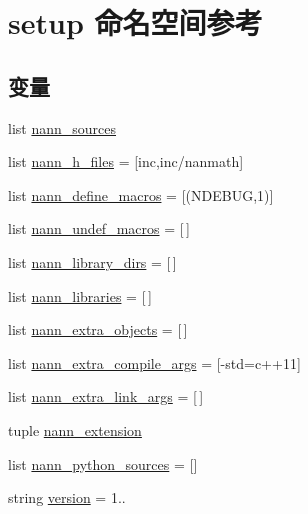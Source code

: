 \hypertarget{namespacesetup}{}\section{setup 命名空间参考}
\label{namespacesetup}
\subsection*{变量}
\begin{DoxyCompactItemize}
\item 
list \hyperlink{namespacesetup_a4b5f9185c7fc55c9c97ee2ff3565c4ae}{nann\+\_\+sources}
\item 
list \hyperlink{namespacesetup_a25d264f9c4a7736a9768459d01558f6e}{nann\+\_\+h\+\_\+files} = \mbox{[}\textquotesingle{}inc\textquotesingle{},\textquotesingle{}inc/nanmath\textquotesingle{}\mbox{]}
\item 
list \hyperlink{namespacesetup_a707ac5d361a916ed078172866c82b945}{nann\+\_\+define\+\_\+macros} = \mbox{[}(\textquotesingle{}N\+D\+E\+B\+U\+G\textquotesingle{},\textquotesingle{}1\textquotesingle{})\mbox{]}
\item 
list \hyperlink{namespacesetup_af38ce6c9c3a49620b55d56731ddc9e25}{nann\+\_\+undef\+\_\+macros} = \mbox{[}$\,$\mbox{]}
\item 
list \hyperlink{namespacesetup_aa5c01e7a20f0777834d3baeb4a26d4ab}{nann\+\_\+library\+\_\+dirs} = \mbox{[}$\,$\mbox{]}
\item 
list \hyperlink{namespacesetup_ae3bc32a9ba0a115dd20666d52d39eeef}{nann\+\_\+libraries} = \mbox{[}$\,$\mbox{]}
\item 
list \hyperlink{namespacesetup_a81583b74353eadcdbfd2817fa9302056}{nann\+\_\+extra\+\_\+objects} = \mbox{[}$\,$\mbox{]}
\item 
list \hyperlink{namespacesetup_a0856af7a2cf5373d7ba13fb91d69da14}{nann\+\_\+extra\+\_\+compile\+\_\+args} = \mbox{[}\textquotesingle{}-\/std=c++11\textquotesingle{}\mbox{]}
\item 
list \hyperlink{namespacesetup_a91c749571f0ed8408640cf8729aa9d7a}{nann\+\_\+extra\+\_\+link\+\_\+args} = \mbox{[}$\,$\mbox{]}
\item 
tuple \hyperlink{namespacesetup_aebabf02abf54d1e0cd11949d52c28be5}{nann\+\_\+extension}
\item 
list \hyperlink{namespacesetup_ada29bda9ada755db57f408d28c2e0b7b}{nann\+\_\+python\+\_\+sources} = \mbox{[}\textquotesingle{}\textquotesingle{}\mbox{]}
\item 
string \hyperlink{namespacesetup_ab177531e7a80674a3db3de2d79eb8be7}{version} = \textquotesingle{}1..\textquotesingle{}

\end{DoxyCompactItemize}
